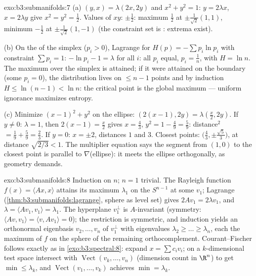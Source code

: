 \begin{solution}{exo:b3:submanifolds:7}
(a) $(y, x) = \lambda(2x, 2y)$ and $x^2 + y^2 = 1$: $y =
2\lambda x$, $x = 2\lambda y$ give $x^2 = y^2 = \frac12$.
Values of $xy$: $\pm\frac12$: maximum $\frac12$ at
$\pm\frac1{\sqrt2}(1,1)$, minimum $-\frac12$ at
$\pm\frac1{\sqrt2}(1,-1)$ (the constraint set is :
extrema exist).

(b) On the  of the simplex ($p_i > 0$), Lagrange for
$H(p) = -\sum p_i\ln p_i$ with constraint $\sum p_i = 1$:
$-\ln p_i - 1 = \lambda$ for all $i$: all $p_i$ equal, $p_i =
\frac1n$, with $H = \ln n$. The maximum over the 
simplex is attained; if it were attained on the boundary
(some $p_i = 0$), the distribution lives on $\leq n - 1$
points and by induction $H \leq \ln(n-1) < \ln n$: the
 critical point is the global maximum --- uniform
ignorance maximizes entropy.

(c) Minimize $(x-1)^2 + y^2$ on the  ellipse:
$(2(x{-}1), 2y) = \lambda(\frac x2, 2y)$. If $y \neq 0$:
$\lambda = 1$, then $2(x - 1) = \frac x2$ gives $x =
\frac43$, $y^2 = 1 - \frac49 = \frac59$: distance$^2$ $=
\frac19 + \frac59 = \frac23$. If $y = 0$: $x = \pm2$,
distances $1$ and $3$. Closest points: $\bigl(\frac43,
\pm\frac{\sqrt5}3\bigr)$, at distance $\sqrt{2/3} < 1$. The
multiplier equation says the segment from $(1,0)$ to the
closest point is parallel to $\nabla$(ellipse): it meets the
ellipse orthogonally, as geometry demands.
\end{solution}

\begin{solution}{exo:b3:submanifolds:8}
Induction on $n$; $n = 1$ trivial. The Rayleigh function
$f(x) = \langle Ax, x\rangle$ attains its maximum $\lambda_1$
on the  $S^{n-1}$ at some $v_1$; Lagrange
(\cref{thm:b3:submanifolds:lagrange}, sphere as level set)
gives $2Av_1 = 2\lambda v_1$, and $\lambda = \langle Av_1,
v_1\rangle = \lambda_1$. The hyperplane $v_1^\perp$ is
$A$-invariant (symmetry: $\langle Av, v_1\rangle = \langle
v, Av_1\rangle = 0$); the restriction is symmetric, and
induction yields an orthonormal eigenbasis $v_2, \dots, v_n$
of $v_1^\perp$ with eigenvalues $\lambda_2 \geq \dots \geq
\lambda_n$, each the maximum of $f$ on the sphere of the
remaining orthocomplement. Courant--Fischer follows exactly
as in \cref{exo:b3:spectral:8}: expand $x = \sum c_iv_i$;
on a $k$-dimensional test space intersect with
$\operatorname{Vect}(v_k, \dots, v_n)$ (dimension count in
$\R^n$) to get $\min \leq \lambda_k$, and
$\operatorname{Vect}(v_1, \dots, v_k)$ achieves $\min =
\lambda_k$.
\end{solution}

